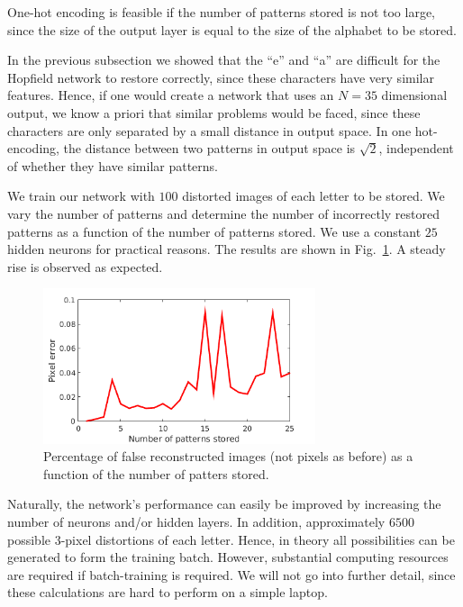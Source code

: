 \documentclass[pdftex,11pt,a4paper]{article}
\begin{document}
One-hot encoding is feasible if the number of patterns stored is not too large, since the size of the output layer is equal to the size of the alphabet to be stored.

In the previous subsection we showed that the ``e'' and ``a'' are difficult for the Hopfield network to restore correctly, since these characters have very similar features. Hence, if one would create a network that uses an $N=35$ dimensional output, we know a priori that similar problems would be faced, since these characters are only separated by a small distance in output space. In one hot-encoding, the distance between two patterns in output space is $\sqrt{2}$, independent of whether they have similar patterns.

We train our network with $100$ distorted images of each letter to be stored. We vary the number of patterns and determine the number of incorrectly restored patterns as a function of the number of patterns stored. We use a constant $25$ hidden neurons for practical reasons. The results are shown in Fig.~\ref{fig:alternative_error}. A steady rise is observed as expected.
\begin{figure}
\centering
\includegraphics[width=8cm]{figs/alternative_error.png}
\caption{Percentage of false reconstructed images (not pixels as before) as a function of the number of patters stored.\label{fig:alternative_error}}
\end{figure}

Naturally, the network's performance can easily be improved by increasing the number of neurons and/or hidden layers. In addition, approximately $6500$ possible 3-pixel distortions of each letter. Hence, in theory all possibilities can be generated to form the training batch. However, substantial computing resources are required if batch-training is required. We will not go into further detail, since these calculations are hard to perform on a simple laptop.

\FloatBarrier
\newpage
\appendix
\end{document}
